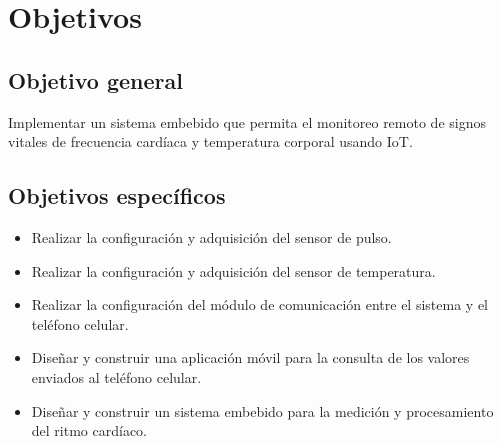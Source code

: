 \section{Objetivos}
\subsection{Objetivo general}
Implementar un sistema embebido que permita el monitoreo remoto de signos vitales de frecuencia cardíaca y temperatura corporal usando IoT.
\subsection{Objetivos específicos}
	\begin{itemize}
		\item Realizar la configuración y adquisición del sensor de pulso.
		\item Realizar la configuración y adquisición del sensor de temperatura.
		\item Realizar la configuración del módulo de comunicación entre el sistema y el teléfono celular.
		\item Diseñar y construir una aplicación móvil para la consulta de los valores enviados al teléfono celular.
		\item Diseñar y construir un sistema embebido para la medición y procesamiento del ritmo cardíaco.
	\end{itemize}	

